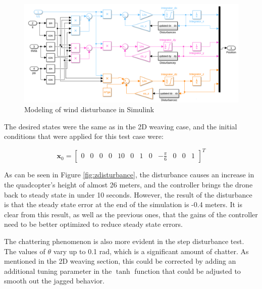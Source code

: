 \documentclass[12pt]{article}
\begin{document}
\begin{center}
\begin{figure}[H]
\captionsetup{width=1\textwidth}
\centering
\includegraphics[width=1\textwidth]{disturbance_simulink.png}
\caption{\label{fig:wind_block}Modeling of wind disturbance in Simulink}
\end{figure}
\end{center}

The desired states were the same as in the 2D weaving case, and the initial conditions that were applied for this test case were:

\begin{equation}
\bm x_0 = \begin{bmatrix}
0 & 0 & 0 & 0 & 10 & 0 & 1 & 0 & -\frac{\pi}{6}& 0 & 0 & 1
\end{bmatrix}^T
\end{equation}

As can be seen in Figure \ref{fig:zdisturbance}, the disturbance causes an increase in the quadcopter's height of almost 26 meters, and the controller brings the drone back to steady state in under 10 seconds. However, the result of the disturbance is that the steady state error at the end of the simulation is -0.4 meters. It is clear from this result, as well as the previous ones, that the gains of the controller need to be better optimized to reduce steady state errors. 

The chattering phenomenon is also more evident in the step disturbance test. The values of $\theta$ vary up to 0.1 rad, which is a significant amount of chatter. As mentioned in the 2D weaving section, this could be corrected by adding an additional tuning parameter in the $\tanh$ function that could be adjusted to smooth out the jagged behavior.
\end{document}
